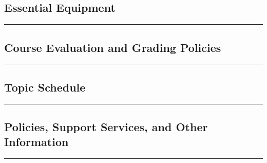 \documentclass[11pt]{handout}
\begin{document}
 
\subsection*{Essential Equipment}

\vspace{2ex}\hrule\vspace{2ex}

   
\subsection*{Course Evaluation and Grading Policies} 

\vspace{2ex}\hrule\vspace{2ex}


\if{}
	{
	    \subsection*{Topic Schedule}
 	    
	     \vspace{2ex}\hrule\vspace{2ex}
	}
\fi


\if{}
	{
	    \subsection*{Policies, Support Services, and Other Information}
 	    
	     \vspace{2ex}\hrule\vspace{2ex}
	}
\fi
 
\end{document}
